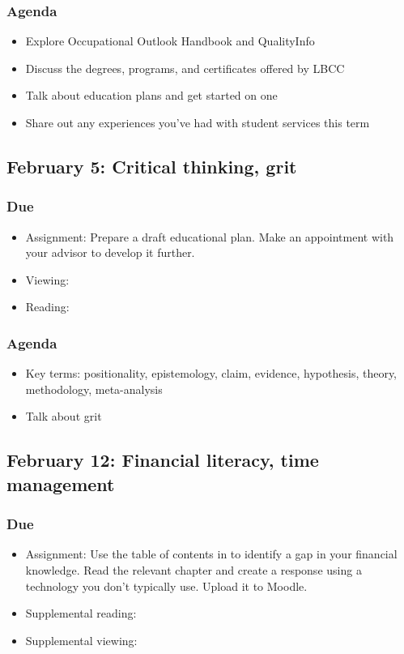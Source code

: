 \documentclass[12pt,article,oneside]{memoir}
\begin{document}
\subsubsection{Agenda}
\begin{itemize}
 \item Explore Occupational Outlook Handbook and QualityInfo
 \item Discuss the degrees, programs, and certificates offered by LBCC
\item Talk about education plans and get started on one
 \item Share out any experiences you've had with student services this term
\end{itemize}


\subsection{February 5: Critical thinking, grit}
\subsubsection{Due}
\begin{itemize}
 \item Assignment: Prepare a draft educational plan.  Make an appointment with your advisor to develop it further.
 \item Viewing: \cite{duckworth}
 \item Reading: \cite{sultan}
\end{itemize}


\subsubsection{Agenda}
\begin{itemize}
\item Key terms: positionality, epistemology, claim, evidence, hypothesis, theory, methodology, meta-analysis
\item Talk about grit
\end{itemize}




\subsection{February 12: Financial literacy, time management}
\subsubsection{Due}
\begin{itemize}
 \item Assignment: Use the table of contents in \cite{everyday} to identify a gap in your financial knowledge.  Read the relevant chapter and create a response using a technology you don't typically use.  Upload it to Moodle.
 \item Supplemental reading: \cite{finra, smart}
 \item Supplemental viewing: \cite{credits}
\end{itemize}
\end{document}
